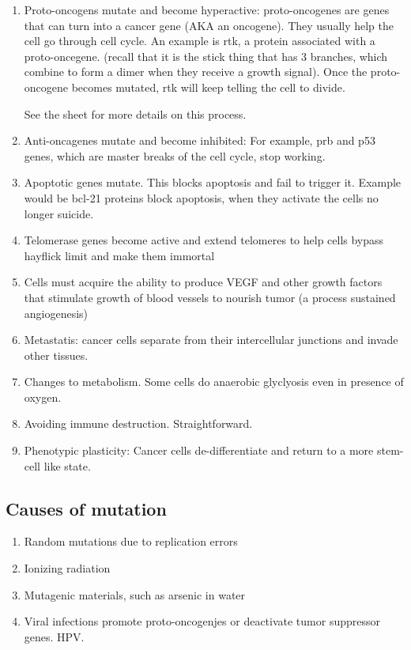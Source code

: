 \documentclass[12pt]{article}
\begin{document}
\begin{enumerate}
    \item Proto-oncogens mutate and become hyperactive: 
    proto-oncogenes are genes that can turn into a cancer gene (AKA
    an oncogene). They usually help the cell go through cell cycle. 
    An example is rtk, a protein associated with a proto-oncegene. (recall 
    that it is the stick thing that has 3 branches, which combine 
    to form a dimer when they receive a growth signal). Once the 
    proto-oncogene becomes mutated, rtk will keep telling the cell to divide.

    See the sheet for more details on this process. 
    \item Anti-oncagenes mutate and become inhibited: 
    For example, prb and p53 genes, which are master breaks of the cell cycle,
    stop working.
    
    \item Apoptotic genes mutate. This blocks apoptosis and fail to trigger it.
    Example would be bcl-21 proteins block apoptosis, when they activate
    the cells no longer suicide. 
    \item Telomerase genes become active and extend telomeres to help cells
    bypass hayflick limit and make them immortal
    \item Cells must acquire the ability to produce VEGF and other growth 
    factors that stimulate growth of blood vessels to nourish tumor
    (a process sustained angiogenesis)
    \item Metastatis: cancer cells separate from their intercellular junctions
    and invade other tissues. 
    \item Changes to metabolism. Some cells do 
    anaerobic glyclyosis even in presence of oxygen. 
    \item Avoiding immune destruction. Straightforward.
    \item Phenotypic plasticity: 
    Cancer cells de-differentiate and return to a more stem-cell
    like state. 
\end{enumerate}

\subsection{Causes of mutation}
\begin{enumerate}
    \item Random mutations due to replication errors
    \item Ionizing radiation
    \item Mutagenic materials, such as arsenic in water
    \item Viral infections promote proto-oncogenjes or 
    deactivate tumor suppressor genes. HPV. 
\end{enumerate}
\end{document}
